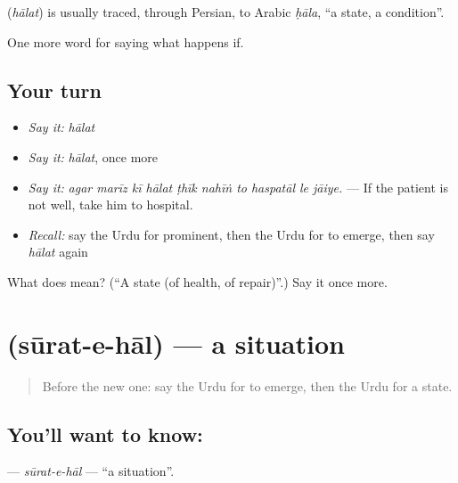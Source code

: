 \begin{cousinweb}
\textbf{} (\emph{hālat}) is usually traced, through Persian, to Arabic \emph{ḥāla}, \textquotedblleft{}a state, a condition\textquotedblright{}.
\end{cousinweb}

\begin{grammarlens}[title={What you've built}]
One more word for saying what happens if.
\end{grammarlens}

\subsection*{Your turn}
\begin{itemize}
\raggedright
  \item \emph{Say it:} \emph{hālat}
  \item \emph{Say it:} \emph{hālat}, once more
  \item \emph{Say it:} \emph{agar marīz kī hālat ṭhīk nahīṅ to haspatāl le jāiye.} — If the patient is not well, take him to hospital.
  \item \emph{Recall:} say the Urdu for prominent, then the Urdu for to emerge, then say \emph{hālat} again
\end{itemize}

\begin{tcolorbox}[breakable,colback=teal!4,colframe=teal!35!black,title={Before you move on}]
What does  mean? (\textquotedblleft{}A state (of health, of repair)\textquotedblright{}.) Say it once more.
\end{tcolorbox}
\section[\texorpdfstring{\ur{صورت} \ur{حال} (sūrat-e-hāl)}{صورت حال (sūrat-e-hāl)}]{  (sūrat-e-hāl) — a situation}

\label{lesson:UR-C365-surat-e-hal}



\begin{quote}
Before the new one: say the Urdu for to emerge, then the Urdu for a state.
\end{quote}

\subsection*{You'll want to know:  }
\textbf{ } — \emph{sūrat-e-hāl} — \textquotedblleft{}a situation\textquotedblright{}.

